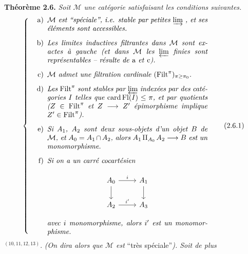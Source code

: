 \textbf{Théorème 2.6.} \textit{Soit $\mathcal{M}$ une catégorie satisfaisant les conditions suivantes.}
\[ \left\{ \begin{minipage}{0.72\textwidth}\itshape
\begin{itemize}[leftmargin=2.5em]
\item[\upshape a)] $\mathcal{M}$ est “spéciale”, i.e. stable par petites $\varinjlim$ , et ses éléments sont accessibles.
\item[\upshape b)] Les limites inductives filtrantes dans $\mathcal{M}$ sont exactes à gauche (et dans $\mathcal{M}$ les $\varprojlim$ finies sont représentables – résulte de \textup{a} et \textup{c}).
\item[\upshape c)] $\mathcal{M}$ admet une filtration cardinale $(\Filt^\pi)_{\pi\geq\pi_0}$.
\item[\upshape d)] Les $\Filt^\pi$ sont stables par $\varprojlim$ indexées par des catégories $I$ telles que $\operatorname{card}\Fl(I) \leq \pi$, et par quotients ($Z \in \Filt^\pi$ et $Z \longrightarrow Z'$ épimorphisme implique $Z' \in \Filt^\pi$).
\item[\upshape e)] Si $A_1$, $A_2$ sont deux sous-objets d'un objet $B$ de $\mathcal{M}$, et $A_0 = A_1 \cap A_2$, alors $A_1 \amalg_{A_0} A_2 \longrightarrow B$ est un monomorphisme.
\item[\upshape f)] Si on a un carré cocartésien
\begin{center}
\begin{tikzcd}
A_0 \arrow[r, "i"] \arrow[d] & A_1 \arrow[d] \\
A_2 \arrow[r, "i'"] & A_3
\end{tikzcd}
\end{center}
avec $i$ monomorphisme, alors $i'$ est un monomorphisme.
\end{itemize}
\end{minipage}\right. \tag*{(2.6.1)} \]
$^{(10,11,12,13)}$. \textit{(On dira alors que $\mathcal{M}$ est} “très spéciale”\textit{). Soit de plus}
